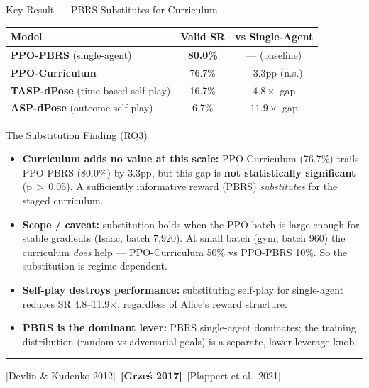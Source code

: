 \documentclass[aspectratio=169,xcolor=dvipsnames,t]{beamer}
\newcommand{\litfooter}[1]{%
  \vspace{2pt}%
  \hrule%
  \vspace{2pt}%
  {\tiny\color{LightDarkGrey} #1}%
}
\begin{document}
\begin{frame}[t]{Key Result — PBRS Substitutes for Curriculum}
  \begin{center}
    \small
    \begin{tabular}{lcc}
      \toprule
      \textbf{Model} & \textbf{Valid SR} & \textbf{vs Single-Agent} \\
      \midrule
      \rowcolor{hlgreen!15}
      \textbf{PPO-PBRS} (single-agent) & \textbf{80.0\%} & — (baseline) \\
      \textbf{PPO-Curriculum} & 76.7\% & $-3.3$pp (n.s.) \\
      \midrule
      \textbf{TASP-dPose} (time-based self-play) & 16.7\% & $4.8\times$ gap \\
      \textbf{ASP-dPose} (outcome self-play) & 6.7\% & $11.9\times$ gap \\
      \bottomrule
    \end{tabular}
  \end{center}

  \vspace{1pt}
  \begin{block}{The Substitution Finding (RQ3)}
    \small
    \begin{itemize}
      \item \textbf{Curriculum adds no value at this scale:} PPO-Curriculum (76.7\%) trails PPO-PBRS (80.0\%) by 3.3pp, but this gap is \textbf{not statistically significant} (p\,$>$\,0.05). A sufficiently informative reward (PBRS) \emph{substitutes} for the staged curriculum.
      \item \textbf{Scope / caveat:} substitution holds when the PPO batch is large enough for stable gradients (Isaac, batch 7{,}920). At small batch (gym, batch 960) the curriculum \emph{does} help — PPO-Curriculum 50\% vs PPO-PBRS 10\%. So the substitution is regime-dependent.
      \item \textbf{Self-play destroys performance:} substituting self-play for single-agent reduces SR 4.8--11.9$\times$, regardless of Alice's reward structure.
      \item \textbf{PBRS is the dominant lever:} PBRS single-agent dominates; the training distribution (random vs adversarial goals) is a separate, lower-leverage knob.
    \end{itemize}
  \end{block}

  \vfill\litfooter{[Devlin \& Kudenko 2012]~\textbf{[Grze\'s 2017]}~[Plappert et al.\ 2021]}
\end{frame}
\end{document}
